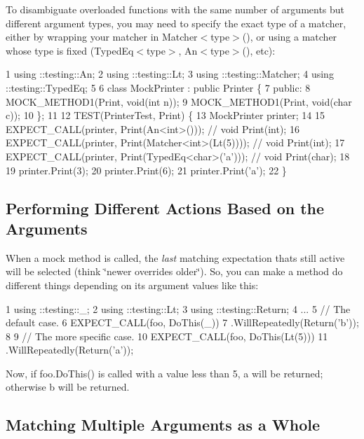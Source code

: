 To disambiguate overloaded functions with the same number of arguments but different argument types, you may need to specify the exact type of a matcher, either by wrapping your matcher in {\ttfamily Matcher$<$type$>$()}, or using a matcher whose type is fixed ({\ttfamily Typed\+Eq$<$type$>$}, {\ttfamily An$<$type$>$()}, etc)\+:


\begin{DoxyCode}
1 using ::testing::An;
2 using ::testing::Lt;
3 using ::testing::Matcher;
4 using ::testing::TypedEq;
5 
6 class MockPrinter : public Printer \{
7  public:
8   MOCK\_METHOD1(Print, void(int n));
9   MOCK\_METHOD1(Print, void(char c));
10 \};
11 
12 TEST(PrinterTest, Print) \{
13   MockPrinter printer;
14 
15   EXPECT\_CALL(printer, Print(An<int>()));            // void Print(int);
16   EXPECT\_CALL(printer, Print(Matcher<int>(Lt(5))));  // void Print(int);
17   EXPECT\_CALL(printer, Print(TypedEq<char>('a')));   // void Print(char);
18 
19   printer.Print(3);
20   printer.Print(6);
21   printer.Print('a');
22 \}
\end{DoxyCode}


\subsection*{Performing Different Actions Based on the Arguments}

When a mock method is called, the {\itshape last} matching expectation that\textquotesingle{}s still active will be selected (think \char`\"{}newer overrides older\char`\"{}). So, you can make a method do different things depending on its argument values like this\+:


\begin{DoxyCode}
1 using ::testing::\_;
2 using ::testing::Lt;
3 using ::testing::Return;
4 ...
5   // The default case.
6   EXPECT\_CALL(foo, DoThis(\_))
7       .WillRepeatedly(Return('b'));
8 
9   // The more specific case.
10   EXPECT\_CALL(foo, DoThis(Lt(5)))
11       .WillRepeatedly(Return('a'));
\end{DoxyCode}


Now, if {\ttfamily foo.\+Do\+This()} is called with a value less than 5, {\ttfamily \textquotesingle{}a\textquotesingle{}} will be returned; otherwise {\ttfamily \textquotesingle{}b\textquotesingle{}} will be returned.

\subsection*{Matching Multiple Arguments as a Whole}

